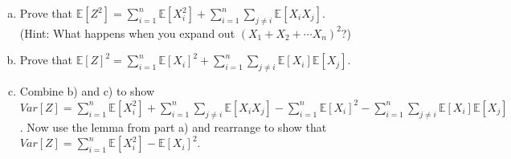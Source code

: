 \documentclass[]{article}
\newif\ifsolutions
\renewcommand{\answer}[1]{{\color{mydarkblue}\textbf{Solution:}#1}}
\def \exx {\mathbb{E}}
\begin{document}
\begin{qunlist}
\begin{enumerate}[a)]
\qpart
\item
Prove that $\exx[Z^2] = \sum\nolimits_{i=1}^n \exx[X_i^2] + \sum_{i=1}^n \sum_{j \neq i} \exx[X_iX_j]$. \\ 
(Hint: 
What happens when you expand out $(X_1 + X_2 + \cdots X_n)^2$?)
\ifsolutions{ \answer {
We start with the hint, we see that $Z = (X_1 + X_2 + \cdots X_n)$, therefore $Z^2 = (X_1 + X_2 + \cdots X_n)^2$. When we expand this out we get \\ $Z^2 = (X_1 + X_2 + \cdots X_n)\cdot(X_1 + X_2 + \cdots X_n)$ To see what happens here we try a smaller example, $\\ (X_1+X_2+X_3)(X_1+X_2+X_3) = (X_1^2 + X_2^2 + X_3^2 + X_1X_2 + X_1X_3 + X_2X_1 + X_2X_3 + X_3X_1 + X_3X_2)$ In general, we have the squared term of each $X_i$ we are adding, and we have all the possible products of $X_i$ and $X_j$ where order matters and $i \neq j$. Therefore, we can generalize as $\\ (X_1 + X_2 + \cdots X_n)\cdot(X_1 + X_2 + \cdots X_n) = (X_1^2 +X_2^2 + \cdots X_n^2 + X_1X_2 + X_1X_3 + \cdots X_1X_n + X_2X_1 + \cdots X_2X_n + \cdots X_nX_{n-1}) \\ =  \sum\nolimits_{i=1}^n X_i^2 + \sum_{i=1}^n \sum_{j \neq i} X_iX_j$. Therefore, by linearity of expectation. \\ $\exx[Z^2] =  \sum\nolimits_{i=1}^n \exx[X_i^2] + \sum_{i=1}^n \sum_{j \neq i} \exx[X_iX_j]$
}}
\fi

\qpart
\item Prove that $\exx[Z]^2 = \sum\nolimits_{i=1}^n \exx[X_i]^2 + \sum_{i=1}^n \sum\limits_{j \neq i} \exx[X_i] \exx[X_j]$.
\ifsolutions{ \answer {
We calculate $\exx[Z]$ and then square it. By linearity of expectation, $\exx[Z] = \exx[X_1] + \exx[X_2] + \cdots + \exx[X_n]$. So, now we wish to calculate $(\exx[X_1] + \cdots + \exx[X_n])^2$. This calculation is similar to what we did before. We will have a term for each $i$ of $\exx[X_i]\exx[X_i]$ and we will have on term for every possible product of $\exx[X_i]$ and $\exx[X_j]$ where order matters and $i \neq j$. Ultimately, \\ $\exx[Z]^2 = \sum\nolimits_{i=1}^n \exx[X_i]\exx[X_i] + \sum_{i=1}^n \sum\limits_{j \neq i} \exx[X_i] \exx[X_j] \\ \exx[Z]^2 = \sum\nolimits_{i=1}^n \exx[X_i]^2 + \sum_{i=1}^n \sum\limits_{j \neq i} \exx[X_i] \exx[X_j]$
}}
\fi
\qpart
\item Combine b) and c) to show $Var[Z] = \sum\nolimits_{i=1}^n \exx[X_i^2] + \sum_{i=1}^n \sum\limits_{j \neq i} \exx[X_iX_j] -  \sum\nolimits_{i=1}^n \exx[X_i]^2 - \sum_{i=1}^n \sum\limits_{j \neq i} \exx[X_i] \exx[X_j]$. Now use the lemma from part a) and rearrange to show that $Var[Z] = \sum\nolimits_{i=1}^n \exx[X_i^2] - \exx[X_i]^2$.


\end{enumerate}
\end{qunlist}
\end{document}
